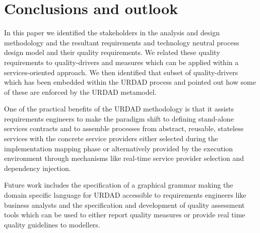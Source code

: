 \section{Conclusions and outlook}

In this paper we identified the stakeholders in the analysis and design methodology and the resultant requirements and technology neutral process design model and their quality requirements. We related these quality requirements to quality-drivers and measures which can be applied within a services-oriented approach. We then identified that subset of quality-drivers which has been embedded within the URDAD process and pointed out how some of these are enforced by the URDAD metamodel.

One of the practical benefits of the URDAD methodology is that it assists requirements engineers to make the paradigm shift\cite{haines_impact_2007} to defining stand-alone services contracts and to assemble processes from abstract, reusable, stateless services with the concrete service providers either selected during the implementation mapping phase or alternatively provided by the execution environment through mechanisms like real-time service provider selection and dependency injection.

Future work includes the specification of a graphical grammar making the domain specific language for URDAD accessible to requirements engineers like business analysts and the specification and development of quality assessment tools which can be used to either report quality measures or provide real time quality guidelines to modellers.